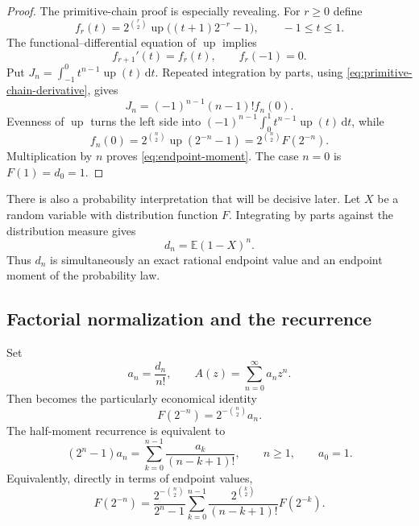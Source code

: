 \documentclass[11pt,oneside]{article}
\theoremstyle{definition}
\theoremstyle{remark}
\newcommand{\Up}{\operatorname{up}}
\newcommand{\dd}{\,\mathrm d}
\newcommand{\E}{\mathbb E}
\begin{document}
\begin{proof}
The primitive-chain proof is especially revealing.  For $r\ge0$ define
\begin{equation}
 f_r(t)=2^{\binom r2}\Up\bigl((t+1)2^{-r}-1\bigr),
 \qquad -1\le t\le1.                                       \label{eq:primitive-chain}
\end{equation}
The functional--differential equation of $\Up$ implies
\begin{equation}
 f_{r+1}'(t)=f_r(t),\qquad f_r(-1)=0.                        \label{eq:primitive-chain-derivative}
\end{equation}
Put $J_n=\int_{-1}^0t^{n-1}\Up(t)\dd t$.  Repeated integration by parts, using
\eqref{eq:primitive-chain-derivative}, gives
\begin{equation}
 J_n=(-1)^{n-1}(n-1)!f_n(0).                                \label{eq:J-chain}
\end{equation}
Evenness of $\Up$ turns the left side into
$(-1)^{n-1}\int_0^1t^{n-1}\Up(t)\dd t$, while
\begin{equation*}
 f_n(0)=2^{\binom n2}\Up(2^{-n}-1)
       =2^{\binom n2}F(2^{-n}).
\end{equation*}
Multiplication by $n$ proves \eqref{eq:endpoint-moment}.  The case $n=0$ is
$F(1)=d_0=1$.
\end{proof}

There is also a probability interpretation that will be decisive later.  Let $X$ be a random
variable with distribution function $F$.  Integrating by parts against the distribution
measure gives
\begin{equation}
 d_n=\E(1-X)^n.                                              \label{eq:dn-endpoint-probability}
\end{equation}
Thus $d_n$ is simultaneously an exact rational endpoint value and an endpoint moment of the
probability law.

\subsection{Factorial normalization and the recurrence}

Set
\begin{equation}
 a_n=\frac{d_n}{n!},
 \qquad
 A(z)=\sum_{n=0}^{\infty}a_nz^n.                            \label{eq:an-A}
\end{equation}
Then  becomes the particularly economical identity
\begin{equation}
 \boxed{F(2^{-n})=2^{-\binom n2}a_n.}                       \label{eq:F-an}
\end{equation}
The half-moment recurrence is equivalent to
\begin{equation}
 (2^n-1)a_n=\sum_{k=0}^{n-1}\frac{a_k}{(n-k+1)!},
 \qquad n\ge1,
 \qquad a_0=1.                                              \label{eq:an-recurrence}
\end{equation}
Equivalently, directly in terms of endpoint values,
\begin{equation}
 F(2^{-n})=
 \frac{2^{-\binom n2}}{2^n-1}
 \sum_{k=0}^{n-1}\frac{2^{\binom k2}}{(n-k+1)!}F(2^{-k}).  \label{eq:F-recurrence}
\end{equation}
\end{document}
